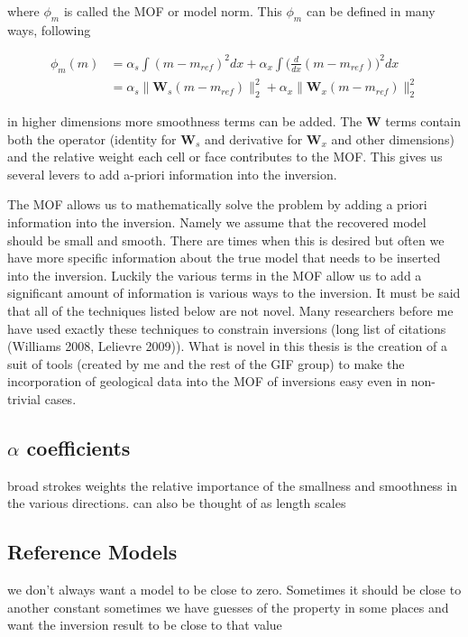 where $\phi_m$ is called the \ac{MOF} or model norm. This $\phi_m$ can be defined in many ways, following  \cite{oldenburg2005inversion}

\begin{align}
\phi_m(m) &= \alpha_s\int(m-m_{ref})^2dx+\alpha_x\int\bigg(\frac{d}{dx}(m-m_{ref})\bigg)^2dx\\
&=\alpha_s\|\textbf{W}_s(m-m_{ref})\|^2_2+\alpha_x\|\textbf{W}_x(m-m_{ref})\|^2_2
\end{align}
\label{eq:MOF}

in higher dimensions more smoothness terms can be added. The $\textbf{W}$ terms contain both the operator (identity for $\textbf{W}_s$ and derivative for $\textbf{W}_x$ and other dimensions) and the relative weight each cell or face contributes to the \ac{MOF}. This gives us several levers to add a-priori information into the inversion.

The \ac{MOF} allows us to mathematically solve the problem by adding a priori information into the inversion. Namely we assume that the recovered model should be small and smooth. There are times when this is desired but often we have more specific information about the true model that needs to be inserted into the inversion. Luckily the various terms in the \ac{MOF} allow us to add a significant amount of information is various ways to the inversion.
	It must be said that all of the techniques listed below are not novel. Many researchers before me have used exactly these techniques to constrain inversions (long list of citations  (Williams 2008, Lelievre 2009)). What is novel in this thesis is the creation of a suit of tools (created by me and the rest of the GIF group) to make the incorporation of geological data into the \ac{MOF} of inversions easy even in non-trivial cases.

\subsection{$\alpha$ coefficients}
\label{sec:alpha coefficients}

broad strokes weights the relative importance of the smallness and smoothness in the various directions. can also be thought of as length scales

\subsection{Reference Models}
\label{sec:Reference Models}

we don't always want a model to be close to zero. Sometimes it should be close to another constant sometimes we have guesses of the property in some places and want the inversion result to be close to that value

